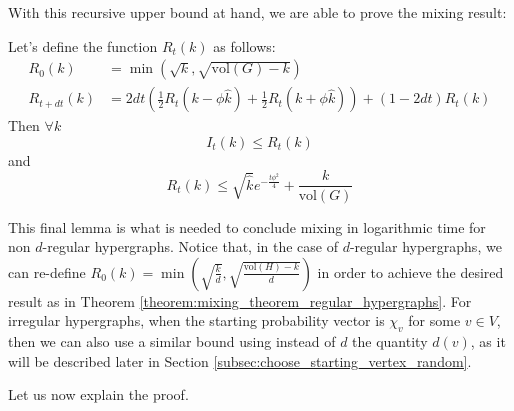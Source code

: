 \documentclass[../main.tex]{subfiles}
\begin{document}
With this recursive upper bound at hand, we are able to prove the mixing result:

\begin{lemma}
\label{lemma:fast_convergence}
    Let's define the function $R_t(k)$ as follows:
    \begin{align}
        R_0(k) & = \min(\sqrt{k}, \sqrt{\text{vol}(G) - k}) \\
        R_{t+dt}(k) & =
            2dt \left(\frac{1}{2} R_t(k - \phi \hat{k}) + \frac{1}{2}R_t(k+\phi \hat{k})\right) + (1 - 2dt) R_t(k)
    \end{align}
    Then $\forall k$
    \begin{equation}
        I_t(k) \leq R_t(k)
    \end{equation}
    and 
    \begin{equation}
        R_t(k) \leq \sqrt{\hat{k}} e^{-\frac{t \phi^2}{4}} + \frac{k}{\text{vol}(G)}
    \end{equation}
\end{lemma}

This final lemma is what is needed to conclude mixing in logarithmic time for non $d$-regular hypergraphs. Notice that, in the case of $d$-regular hypergraphs, we can re-define $R_0(k) = \min\left(\sqrt{\frac{k}{d}}, \sqrt{\frac{\text{vol}(H)-k}{d}}\right)$ in order to achieve the desired result as in Theorem \ref{theorem:mixing_theorem_regular_hypergraphs}. For irregular hypergraphs, when the starting probability vector is $\chi_v$ for some $v\in V$, then we can also use a similar bound using instead of $d$ the quantity $d(v)$, as it will be described later in Section \ref{subsec:choose_starting_vertex_random}. 

Let us now explain the proof. 
\end{document}
